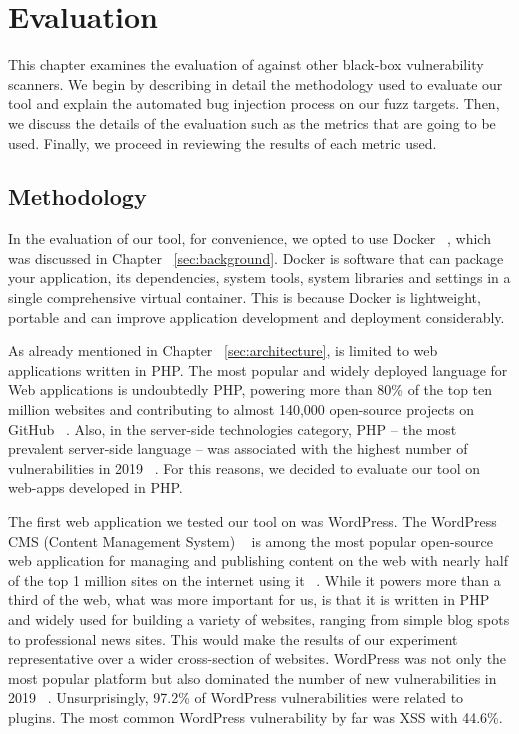 \chapter{Evaluation}
\label{sec:evaluation}
\minitoc
\vspace*{1cm}

This chapter examines the evaluation of \pname{} against other black-box vulnerability scanners. We begin by describing in detail the methodology used to evaluate our tool and explain the automated bug injection process on our fuzz targets. Then, we discuss the details of the evaluation such as the metrics that are going to be used. Finally, we proceed in reviewing the results of each metric used.

\section{Methodology}
\label{sec:dockerStack}
In the evaluation of our tool, for convenience, we opted to use Docker ~\cite{docker_def}, which was discussed in Chapter ~\ref{sec:background}. Docker is software that can package your application, its dependencies, system tools, system libraries and settings in a single comprehensive virtual container. This is because Docker is lightweight, portable and can improve application development and deployment considerably.

As already mentioned in Chapter ~\ref{sec:architecture}, \pname{} is limited to web applications written in PHP. The most popular and widely deployed language for Web applications is undoubtedly PHP, powering more than 80\% of the top ten million websites and contributing to almost 140,000 open-source projects on GitHub ~\cite{githubinfo}. Also, in the server-side technologies category, PHP – the most prevalent server-side language – was associated with the highest number of vulnerabilities in 2019 ~\cite{vulnerabilities2019state}. For this reasons, we decided to evaluate our tool on web-apps developed in PHP.

The first web application we tested our tool on was WordPress. The WordPress CMS (Content Management System) ~\cite{docker_def} is among the most popular open-source web application for managing and publishing content on the web with nearly half of the top 1 million sites on the internet using it ~\cite{cmsusage}. While it powers more than a third of the web, what was more important for us, is that it is written in PHP and widely used for building a variety of websites, ranging from simple blog spots to professional news sites. This would make the results of our experiment representative over a wider cross-section of websites. WordPress was not only the most popular platform but also dominated the number of new vulnerabilities in 2019 ~\cite{vulnerabilities2019state}. Unsurprisingly, 97.2\% of WordPress vulnerabilities were related to plugins. The most common WordPress vulnerability by far was XSS with 44.6\%. 

